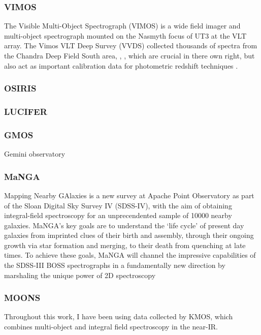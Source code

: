 \documentclass{literature}
\begin{document}
\subsubsection{VIMOS}\label{subsubsec:VIMOS}
The Visible Multi-Object Spectrograph (VIMOS) \citep{LeFevre2003} is a wide field imager and multi-object spectrograph mounted on the Nasmyth focus of UT3 at the VLT array. The Vimos VLT Deep Survey (VVDS) collected thousands of spectra from the Chandra Deep Field South area, \citep{LeFvre2004}, \citep{LeFevre2005}, which are crucial in there own right, but also act as important calibration data for photometric redshift techniques \citep{Ilbert2006}.

\subsubsection{OSIRIS}\label{subsubsec:OSIRIS}


\subsubsection{LUCIFER}\label{LUCIFER}

\subsubsection{GMOS}
Gemini observatory 

\subsubsection{MaNGA}\label{subsubsec:MaNGA}
Mapping Nearby GAlaxies is a new survey at Apache Point Observatory as part of the Sloan Digital Sky Survey IV (SDSS-IV), with the aim of obtaining integral-field spectroscopy for an unprecendented sample of 10000 nearby galaxies. MaNGA's key goals are to understand the `life cycle' of present day galaxies from imprinted clues of their birth and assembly, through their ongoing growth via star formation and merging, to their death from quenching at late times. To achieve these goals, MaNGA will channel the impressive capabilities of the SDSS-III BOSS spectrographs in a fundamentally new direction by marshaling the unique power of 2D spectroscopy

\subsubsection{MOONS}\label{subsubsec:MOONS}
Throughout this work, I have been using data collected by KMOS, which combines multi-object and integral field spectroscopy in the near-IR. 
\end{document}
